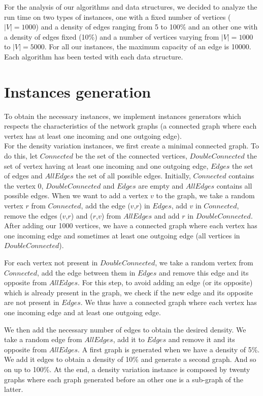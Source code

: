 For the analysis of our algorithms and data structures, we decided to analyze the run time on two types of instances, one with a fixed number of vertices ($|V|=1000$) and a density of edges ranging from 5 to 100\% and an other one with a density of edges fixed (10\%) and a number of vertices varying from $|V|=1000$ to $|V|=5000$. For all our instances, the maximum capacity of an edge is 10000.
Each algorithm has been tested with each data structure.

\section{Instances generation}
To obtain the necessary instances, we implement instances generators which respects the characteristics of the network graphs (a connected graph where each vertex has at least one incoming and one outgoing edge). \\

For the density variation instances, we first create a minimal connected graph. To do this, let $Connected$ be the set of the connected vertices, $DoubleConnected$ the set of vertex having at least one incoming and one outgoing edge, $Edges$ the set of edges and $AllEdges$ the set of all possible edges. Initially, $Connected$ contains the vertex 0, $DoubleConnected$ and $Edges$ are empty and $AllEdges$ contains all possible edges. When we want to add a vertex $v$ to the graph, we take a random vertex $r$ from $Connected$, add the edge ($v$,$r$) in $Edges$, add $v$ in $Connected$, remove the edges ($v$,$r$) and ($r$,$v$) from $AllEdges$ and add $r$ in $DoubleConnected$. After adding our 1000 vertices, we have a connected graph where each vertex has one incoming edge and sometimes at least one outgoing edge (all vertices in $DoubleConnected$).

For each vertex not present in $DoubleConnected$, we take a random vertex from $Connected$, add the edge between them in $Edges$ and remove this edge and its opposite from $AllEdges$. For this step, to avoid adding an edge (or its opposite) which is already present in the graph, we check if the new edge and its opposite are not present in $Edges$. We thus have a connected graph where each vertex has one incoming edge and at least one outgoing edge.

We then add the necessary number of edges to obtain the desired density. We take a random edge from $AllEdges$, add it to $Edges$ and remove it and its opposite from $AllEdges$. A first graph is generated when we have a density of 5\%. We add it edges to obtain a density of 10\% and generate a second graph. And so on up to 100\%. At the end, a density variation instance is composed by twenty graphs where each graph generated before an other one is a sub-graph of the latter.

